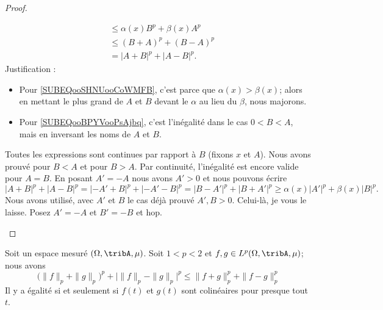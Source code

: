 \begin{proof}
\begin{subproof}
\begin{subequations}
\begin{align}
				                                 & \leq \alpha(x)B^p+\beta(x)A^p      \label{SUBEQooSHNUooCoWMFB} \\
				                                 & \leq (B+A)^p+(B-A)^p       \label{SUBEQooBPYVooPsAjbq}         \\
				                                 & =| A+B |^p+| A-B |^p.
			\end{align}
		\end{subequations}
		Justification :
		\begin{itemize}
			\item Pour \eqref{SUBEQooSHNUooCoWMFB}, c'est parce que \( \alpha(x)>\beta(x)\); alors en mettant le plus grand de \( A\) et \( B\) devant le \( \alpha\) au lieu du \( \beta\), nous majorons.
			\item Pour \eqref{SUBEQooBPYVooPsAjbq}, c'est l'inégalité dans le cas \( 0<B<A\), mais en inversant les noms de \( A\) et \( B\).
		\end{itemize}
		\spitem[Pour \( 0<A=B\)]
		Toutes les expressions sont continues par rapport à \( B\) (fixons \( x\) et \( A\)). Nous avons prouvé pour \( B<A\) et pour \( B>A\). Par continuité, l'inégalité est encore valide pour \( A=B\).
		\spitem[Pour \( A<0\), \( B>0\)]
		En posant \( A'=-A\) nous avons \( A'>0\) et nous pouvons écrire
		\begin{equation}
			| A+B |^p+| A-B |^p=| -A'+B |^p+| -A'-B |^p=| B-A' |^p+| B+A' |^p\geq \alpha(x)| A' |^p+\beta(x)| B |^p.
		\end{equation}
		Nous avons utilisé, avec \( A'\) et \( B\) le cas déjà prouvé \( A',B>0\).
		\spitem[Pour \( A>0\), \( B<0\)]
		Celui-là, je vous le laisse.
		\spitem[Pour \( A<0\), \( B<0\)]
		Posez \( A'=-A\) et \( B'=-B\) et hop.
	\end{subproof}
\end{proof}


\begin{theorem}       \label{THOooZRRYooBTBQKW}
	Soit un espace mesuré \(  (\Omega,\tribA,\mu)\). Soit \( 1<p<2\) et \( f,g\in L^p(\Omega,\tribA,\mu)\); nous avons
	\begin{equation}
		\big( \| f \|_p+\| g \|_p \big)^p+\Big| \| f \|_p-\| g \|_p \Big|^p
		\leq \| f+g \|_p^p+\| f-g \|_p^p
	\end{equation}
	Il y a égalité si et seulement si \( f(t) \) et \( g(t)\) sont colinéaires pour presque tout \( t\).
\end{theorem}

